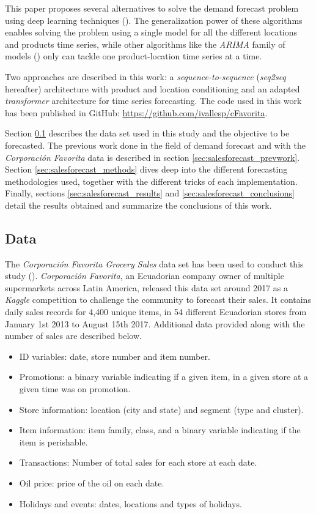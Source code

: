 This paper proposes several alternatives to solve the demand forecast problem using deep learning techniques (\cite{Goodfellow2016}). The generalization power of these algorithms enables solving the problem using a single model for all the different locations and products time series, while other algorithms like the \textit{ARIMA} family of models (\cite{Hyndman2018}) only can tackle one product-location time series at a time.

Two approaches are described in this work: a \textit{sequence-to-sequence} (\textit{seq2seq} hereafter) architecture with product and location conditioning and an adapted \textit{transformer} architecture for time series forecasting. The code used in this work has been published in GitHub: \url{https://github.com/ivallesp/cFavorita}.

Section \ref{sec:salesforecast_data} describes the data set used in this study and the objective to be forecasted. The previous work done in the field of demand forecast and with the \textit{Corporación Favorita} data is described in section \ref{sec:salesforecast_prevwork}. Section \ref{sec:salesforecast_methods} dives deep into the different forecasting methodologies used, together with the different tricks of each implementation.
Finally, sections \ref{sec:salesforecast_results} and \ref{sec:salesforecast_conclusions} detail the results obtained and summarize the conclusions of this work.


\subsection{Data} \label{sec:salesforecast_data}
The \textit{Corporación Favorita Grocery Sales} data set  has been used to conduct this study (\cite{corporacionfavoritadataset2018}). \textit{Corporación Favorita}, an Ecuadorian company owner of multiple supermarkets across Latin America, released this data set around 2017 as a \textit{Kaggle} competition to challenge the community to forecast their sales. It contains daily sales records for 4,400 unique items, in 54 different Ecuadorian stores from January 1st 2013 to August 15th 2017. Additional data provided along with the number of sales are described below.

\begin{itemize}
	\item ID variables: date, store number and item number.
	\item Promotions: a binary variable indicating if a given item, in a given store at a given time was on promotion.
	\item Store information: location (city and state) and segment (type and cluster).
	\item Item information: item family, class, and a binary variable indicating if the item is perishable.
	\item Transactions: Number of total sales for each store at each date.
	\item Oil price: price of the oil on each date.
	\item Holidays and events: dates, locations and types of holidays.
\end{itemize}

